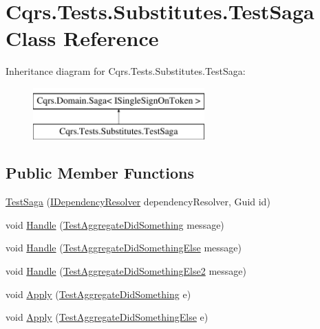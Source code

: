 \hypertarget{classCqrs_1_1Tests_1_1Substitutes_1_1TestSaga}{}\section{Cqrs.\+Tests.\+Substitutes.\+Test\+Saga Class Reference}
\label{classCqrs_1_1Tests_1_1Substitutes_1_1TestSaga}
Inheritance diagram for Cqrs.\+Tests.\+Substitutes.\+Test\+Saga\+:\begin{figure}[H]
\begin{center}
\leavevmode
\includegraphics[height=2.000000cm]{classCqrs_1_1Tests_1_1Substitutes_1_1TestSaga}
\end{center}
\end{figure}
\subsection*{Public Member Functions}
\begin{DoxyCompactItemize}
\item 
\hyperlink{classCqrs_1_1Tests_1_1Substitutes_1_1TestSaga_add3c932a45b03e651a09bc0df79fa267}{Test\+Saga} (\hyperlink{interfaceCqrs_1_1Configuration_1_1IDependencyResolver}{I\+Dependency\+Resolver} dependency\+Resolver, Guid id)
\item 
void \hyperlink{classCqrs_1_1Tests_1_1Substitutes_1_1TestSaga_a7ee08daccfa798c17e08ceaf4d06e65d}{Handle} (\hyperlink{classCqrs_1_1Tests_1_1Substitutes_1_1TestAggregateDidSomething}{Test\+Aggregate\+Did\+Something} message)
\item 
void \hyperlink{classCqrs_1_1Tests_1_1Substitutes_1_1TestSaga_a25e222765c57e5dad8af26dfbeed9531}{Handle} (\hyperlink{classCqrs_1_1Tests_1_1Substitutes_1_1TestAggregateDidSomethingElse}{Test\+Aggregate\+Did\+Something\+Else} message)
\item 
void \hyperlink{classCqrs_1_1Tests_1_1Substitutes_1_1TestSaga_a5dd814be4b049bafa2e2b516a34e7045}{Handle} (\hyperlink{classCqrs_1_1Tests_1_1Substitutes_1_1TestAggregateDidSomethingElse2}{Test\+Aggregate\+Did\+Something\+Else2} message)
\item 
void \hyperlink{classCqrs_1_1Tests_1_1Substitutes_1_1TestSaga_a869b24d355dca9bd4e3ddbd7ed4a8834}{Apply} (\hyperlink{classCqrs_1_1Tests_1_1Substitutes_1_1TestAggregateDidSomething}{Test\+Aggregate\+Did\+Something} e)
\item 
void \hyperlink{classCqrs_1_1Tests_1_1Substitutes_1_1TestSaga_ac2999d7210bdf7624e91aa81238f347e}{Apply} (\hyperlink{classCqrs_1_1Tests_1_1Substitutes_1_1TestAggregateDidSomethingElse}{Test\+Aggregate\+Did\+Something\+Else} e)
\end{DoxyCompactItemize}
